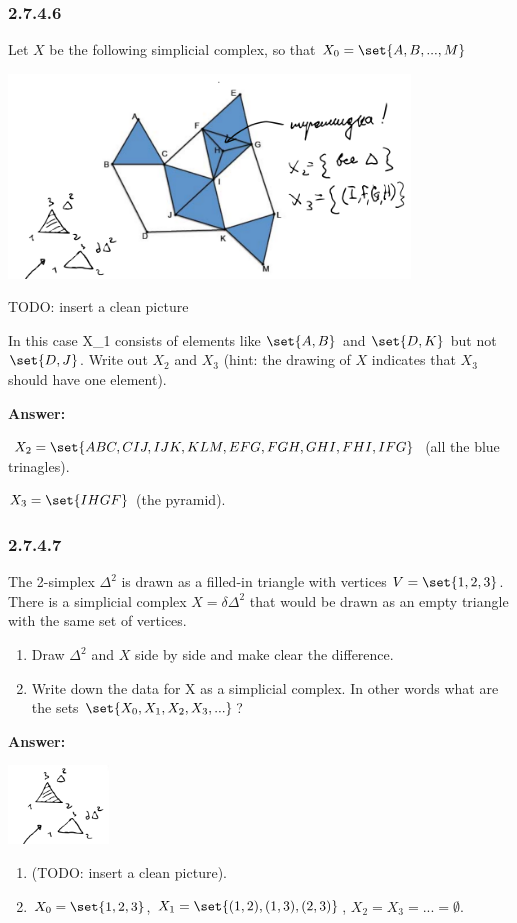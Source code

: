 \documentclass{article}
\newcommand{\N}{\mathbb{N}}
\newcommand{\Pow}{\mathbb{P}}
\newcommand{\vsp}[0]{\vspace*{10pt}\par}
\newcommand{\exercise}[1]{\subsubsection*{#1}}
\newcommand{\ans}[0]{\vsp\textbf{Answer: }\vsp}
\newcommand{\U}[1]{{\underline{#1}}}
\newcommand{\ei}{\item}
\newcommand{\eb}{\begin{enumerate}[label=(\alph*)]\ei}
\newcommand{\ee}{\end{enumerate}}
\begin{document}

\exercise{2.7.4.6}

Let $X$ be the following simplicial complex, so that $X_0 = \set{A, B, ... , M}$

\begin{center}
\includegraphics[width=0.8\textwidth]{img/simplicial_complex.png}
\end{center}

TODO: insert a clean picture

In this case X_1 consists of elements like $\set{A,B}$ and $\set{D,K}$ but not
$\set{D,J}$.  Write out $X_2$ and $X_3$ (hint: the drawing of $X$ indicates that
$X_3$ should have one element).

\ans

$X_2 = \set{ABC, CIJ, IJK, KLM, EFG, FGH, GHI, FHI, IFG}$ (all the blue
trinagles).

$X_3 = \set{IHGF}$ (the pyramid).

\exercise{2.7.4.7}

The 2-simplex $\Delta^2$ is drawn as a filled-in triangle with vertices $V =
\set{1, 2, 3}$. There is a simplicial complex $X = \delta \Delta^2$ that would
be drawn as an empty triangle with the same set of vertices.

\eb Draw $\Delta^2$ and $X$ side by side and make clear the difference.
\ei Write down the data for X as a simplicial complex. In other words what are
    the sets $\set{X_0, X_1, X_2, X_3, ...}$?
\ee

\ans
\begin{center}
\includegraphics[width=0.2\textwidth]{img/simplicial_complex_example.png}
\end{center}
\eb (TODO: insert a clean picture).
\ei $X_0 = \set{1,2,3}$, $X_1 = \set{(1,2), (1,3), (2,3)}$, $X_2 = X_3 = ... =
    \emptyset$.
\ee
\end{document}
